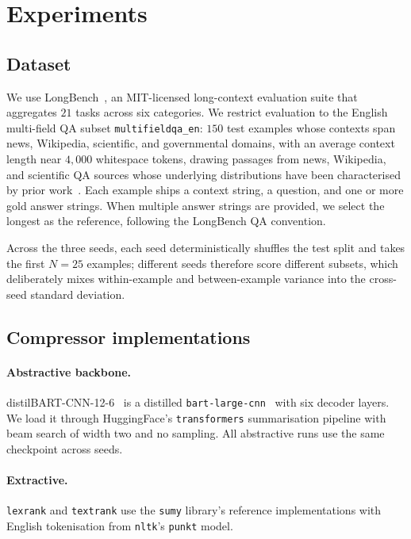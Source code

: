 \documentclass[11pt]{article}
\begin{document}
\section{Experiments}
\label{sec:experiments}

\subsection{Dataset}
\label{sec:exp-dataset}

We use LongBench~\citep{bai2023longbench}, an MIT-licensed long-context
evaluation suite that aggregates $21$ tasks across six categories. We
restrict evaluation to the English multi-field QA subset
\texttt{multifieldqa\_en}: $150$ test examples whose contexts span
news, Wikipedia, scientific, and governmental domains, with an average
context length near $4{,}000$ whitespace tokens, drawing passages from
news, Wikipedia, and scientific QA sources whose underlying distributions
have been characterised by prior work~\citep{kwiatkowski2019natural}. Each example ships a
context string, a question, and one or more gold answer strings. When
multiple answer strings are provided, we select the longest as the
reference, following the LongBench QA convention.

Across the three seeds, each seed deterministically shuffles the test
split and takes the first $N = 25$ examples; different seeds therefore
score different subsets, which deliberately mixes within-example and
between-example variance into the cross-seed standard deviation.

\subsection{Compressor implementations}
\label{sec:exp-models}

\paragraph{Abstractive backbone.}
distilBART-CNN-12-6~\citep{shleifer2020distilbart} is a distilled
\texttt{bart-large-cnn}~\citep{lewis2020bart} with six decoder layers.
We load it through HuggingFace's \texttt{transformers} summarisation
pipeline with beam search of width two and no sampling. All abstractive
runs use the same checkpoint across seeds.

\paragraph{Extractive.}
\texttt{lexrank} and \texttt{textrank} use the \texttt{sumy} library's
reference implementations with English tokenisation from
\texttt{nltk}'s \texttt{punkt} model.
\end{document}
